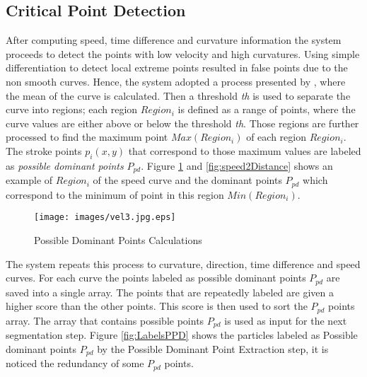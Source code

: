 \subsection{Critical Point Detection}
\label{sec:CriticalPointDetection}
After computing speed, time difference and curvature information the system proceeds to detect the points with low velocity and high curvatures. Using simple differentiation to detect local extreme points resulted in false points due to the non smooth curves. Hence, the system adopted a process presented by \cite{earlyprocess}, where the mean of the curve is calculated. Then a threshold \textit{th} is used to separate the curve into regions; each region $Region_i$ is defined as a range of points, where the curve values are either above or below the threshold \textit{th}. Those regions are further processed to find the maximum point $Max(Region_i)$ of each region $Region_i$. The stroke points $p_i(x,y)$ that correspond to those maximum values are labeled as \textit{possible dominant points} $P_{pd}$. Figure \ref{fig:MaxRegioi} and \ref{fig:speed2Distance} shows an example of $Region_i$ of the speed curve and the dominant points $P_{pd}$ which correspond to the minimum of point in this region $Min(Region_i)$.  %
\begin{figure}
	\centering
		\texttt{[image: images/vel3.jpg.eps]}
	\caption{Possible Dominant Points Calculations}
	\label{fig:MaxRegioi}
\end{figure}

  
The system repeats this process to curvature, direction, time difference and speed curves. For each curve the points labeled as possible dominant points $P_{pd}$ are saved into a single array. The points that are repeatedly labeled are given a higher score than the other points. This score is then used to sort the  $P_{pd}$ points array. The array that contains possible points $P_{pd}$ is used as input for the next segmentation step. Figure \ref{fig:LabelsPPD} shows the particles labeled as Possible dominant points $P_{pd}$ by the Possible Dominant Point Extraction step, it is noticed the redundancy of some $P_{pd}$ points. 


